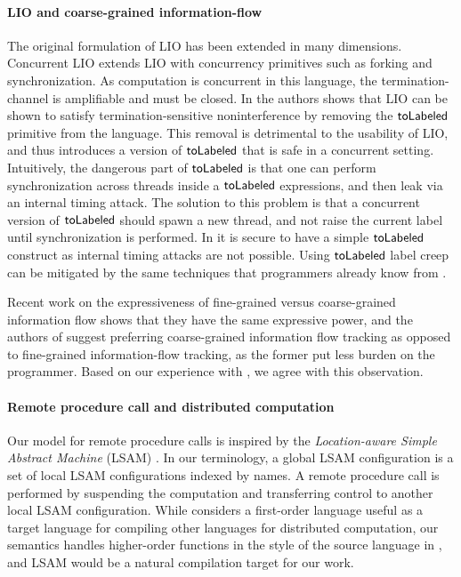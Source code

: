\paragraph{LIO and coarse-grained information-flow}
The original formulation of LIO \cite{SRMMlio} has been extended in many dimensions. Concurrent LIO \cite{Stefan:2012:ACT:2364527.2364557} extends LIO with concurrency primitives such as forking and synchronization. As computation is concurrent in this language, the termination-channel is amplifiable \cite{Askarov:2008:TNL:1462455.1462485} and must be closed. In \cite{Stefan:2012:ACT:2364527.2364557} the authors shows that LIO can be shown to satisfy termination-sensitive noninterference by removing the $\mathsf{toLabeled}$ primitive from the language. This removal is detrimental to the usability of LIO, and thus \cite{Stefan:2012:ACT:2364527.2364557} introduces a version of $\mathsf{toLabeled}$ that is safe in a concurrent setting. Intuitively, the dangerous part of $\mathsf{toLabeled}$ is that one can perform synchronization across threads inside a $\mathsf{toLabeled}$ expressions, and then leak via an internal timing attack. The solution to this problem is that a concurrent version of $\mathsf{toLabeled}$ should spawn a new thread, and not raise the current label until synchronization is performed. In \lang{} it is secure to have a simple $\mathsf{toLabeled}$ construct as internal timing attacks are not possible. Using $\mathsf{toLabeled}$ label creep can be mitigated by the same techniques that programmers already know from \cite{SRMMlio}.

Recent work \cite{Rajani2018, Vassena2019} on the expressiveness of fine-grained versus coarse-grained information flow shows that they have the same expressive power, and the authors of \cite{Rajani2018} suggest preferring coarse-grained information flow tracking as opposed to fine-grained information-flow tracking, as the former put less burden on the programmer. Based on our experience with \lang{}, we agree with this observation.

\paragraph{Remote procedure call and distributed computation}
Our model for remote procedure calls is inspired by the \emph{Location-aware Simple Abstract Machine} (LSAM) \cite{10.1007/978-3-642-25462-8_28}. In our terminology, a global LSAM configuration is a set of local LSAM configurations indexed by names. A remote procedure call is performed by suspending the computation and transferring control to another local LSAM configuration. While \cite{10.1007/978-3-642-25462-8_28} considers a first-order language useful as a target language for compiling other languages for distributed computation, our semantics handles higher-order functions in the style of the source language in \cite{Cooper:2009:RC:1599410.1599439}, and LSAM would be a natural compilation target for our work.


